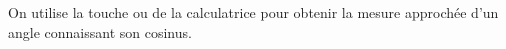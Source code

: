 
On utilise la touche   ou  de la calculatrice pour obtenir la mesure approchée d'un angle connaissant son cosinus.